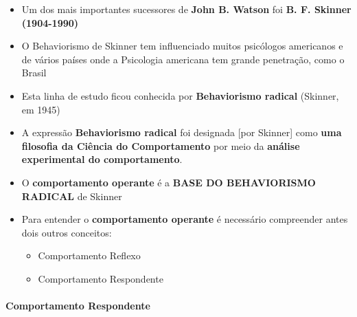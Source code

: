 \documentclass[
]{book}
\providecommand{\tightlist}{%
  \setlength{\itemsep}{0pt}\setlength{\parskip}{0pt}}
\begin{document}
\begin{itemize}
\tightlist
\item
  Um dos mais importantes sucessores de \textbf{John B. Watson} foi \textbf{B. F. Skinner (1904-1990)}
\item
  O Behaviorismo de Skinner tem influenciado muitos psicólogos americanos e de vários países onde a Psicologia americana tem grande penetração, como o Brasil
\item
  Esta linha de estudo ficou conhecida por \textbf{Behaviorismo radical} (Skinner, em 1945)
\item
  A expressão \textbf{Behaviorismo radical} foi designada {[}por Skinner{]} como \textbf{uma filosofia da Ciência do Comportamento} por meio da \textbf{análise experimental do comportamento}.
\item
  O \textbf{comportamento operante} é a \textbf{BASE DO BEHAVIORISMO RADICAL} de Skinner
\item
  Para entender o \textbf{comportamento operante} é necessário compreender antes dois outros conceitos:

  \begin{itemize}
  \tightlist
  \item
    Comportamento Reflexo
  \item
    Comportamento Respondente
  \end{itemize}
\end{itemize}

\hypertarget{comportamento-respondente}{%
\paragraph{Comportamento Respondente}\label{comportamento-respondente}}
\end{document}

